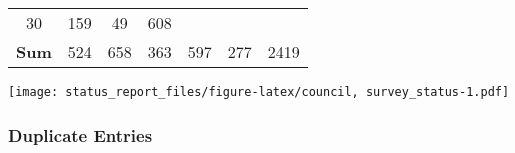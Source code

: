 \documentclass[]{article}
\begin{document}
\begin{longtable}[]{@{}ccccccc@{}}
\begin{minipage}[t]{0.14\columnwidth}
30\strut
\end{minipage} & \begin{minipage}[t]{0.05\columnwidth}\centering\strut
159\strut
\end{minipage} & \begin{minipage}[t]{0.05\columnwidth}\centering\strut
49\strut
\end{minipage} & \begin{minipage}[t]{0.05\columnwidth}\centering\strut
608\strut
\end{minipage}\tabularnewline
\begin{minipage}[t]{0.26\columnwidth}\centering\strut
\textbf{Sum}\strut
\end{minipage} & \begin{minipage}[t]{0.13\columnwidth}\centering\strut
524\strut
\end{minipage} & \begin{minipage}[t]{0.14\columnwidth}\centering\strut
658\strut
\end{minipage} & \begin{minipage}[t]{0.14\columnwidth}\centering\strut
363\strut
\end{minipage} & \begin{minipage}[t]{0.05\columnwidth}\centering\strut
597\strut
\end{minipage} & \begin{minipage}[t]{0.05\columnwidth}\centering\strut
277\strut
\end{minipage} & \begin{minipage}[t]{0.05\columnwidth}\centering\strut
2419\strut
\end{minipage}\tabularnewline
\bottomrule
\end{longtable}

\texttt{[image: status\_report\_files/figure-latex/council, survey\_status-1.pdf]}

\subsubsection{Duplicate Entries}\label{duplicate-entries}
\end{document}
